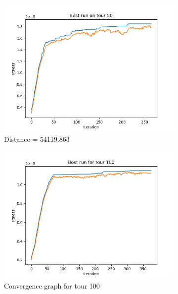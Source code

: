 \documentclass[a4paper,10pt]{article}
\begin{document}
\begin{figure}
\begin{subfigure}[b]{0.49\textwidth}
         \centering
         \includegraphics[width=\textwidth]{plots/plot_50}
         \caption{Distance = 54119.863}
         \label{fig:gb50}
     \end{subfigure}
     \hfill
     \begin{subfigure}[b]{0.49\textwidth}
         \centering
         \includegraphics[width=\textwidth]{plots/plot_100}
		\caption{Convergence graph for tour 100}
		\label{fig:cg100}
     \end{subfigure}
      \begin{subfigure}[b]{0.49\textwidth}
         \centering

\end{subfigure}
\end{figure}
\end{document}
